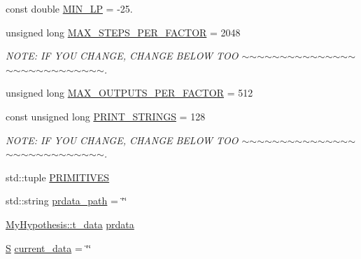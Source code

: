\begin{DoxyCompactItemize}
\item 
const double \hyperlink{_formal_language_theory-_complex_2_main_8cpp_afd489951f6acf58f00e714472db8b9f9}{M\+I\+N\+\_\+\+LP} = -\/25.
\item 
unsigned long \hyperlink{_formal_language_theory-_complex_2_main_8cpp_a33cfa353d2570ba1bc9b45b924e890ff}{M\+A\+X\+\_\+\+S\+T\+E\+P\+S\+\_\+\+P\+E\+R\+\_\+\+F\+A\+C\+T\+OR} = 2048
\begin{DoxyCompactList}\small\item\em N\+O\+TE\+: IF Y\+OU C\+H\+A\+N\+GE, C\+H\+A\+N\+GE B\+E\+L\+OW T\+OO $\sim$$\sim$$\sim$$\sim$$\sim$$\sim$$\sim$$\sim$$\sim$$\sim$$\sim$$\sim$$\sim$$\sim$$\sim$$\sim$$\sim$$\sim$$\sim$$\sim$$\sim$$\sim$$\sim$$\sim$$\sim$$\sim$$\sim$$\sim$. \end{DoxyCompactList}\item 
unsigned long \hyperlink{_formal_language_theory-_complex_2_main_8cpp_a78ab994cd90dbad4d470e8b4082ef882}{M\+A\+X\+\_\+\+O\+U\+T\+P\+U\+T\+S\+\_\+\+P\+E\+R\+\_\+\+F\+A\+C\+T\+OR} = 512
\item 
const unsigned long \hyperlink{_formal_language_theory-_complex_2_main_8cpp_a2806650ae26591d113cbc7f3d5184387}{P\+R\+I\+N\+T\+\_\+\+S\+T\+R\+I\+N\+GS} = 128
\begin{DoxyCompactList}\small\item\em N\+O\+TE\+: IF Y\+OU C\+H\+A\+N\+GE, C\+H\+A\+N\+GE B\+E\+L\+OW T\+OO $\sim$$\sim$$\sim$$\sim$$\sim$$\sim$$\sim$$\sim$$\sim$$\sim$$\sim$$\sim$$\sim$$\sim$$\sim$$\sim$$\sim$$\sim$$\sim$$\sim$$\sim$$\sim$$\sim$$\sim$$\sim$$\sim$$\sim$$\sim$. \end{DoxyCompactList}\item 
std\+::tuple \hyperlink{_formal_language_theory-_complex_2_main_8cpp_a04e6d8e4b74d3f4fc965e5e5449158a3}{P\+R\+I\+M\+I\+T\+I\+V\+ES}
\item 
std\+::string \hyperlink{_formal_language_theory-_complex_2_main_8cpp_aad659d32cecc0fd81857e5dbb67e0b1c}{prdata\+\_\+path} = \char`\"{}\char`\"{}
\item 
\hyperlink{class_bayesable_a70a593a67c7d43239ecc06bb4fd06a6b}{My\+Hypothesis\+::t\+\_\+data} \hyperlink{_formal_language_theory-_complex_2_main_8cpp_a5d75b43046f6e95350ab4ecc92d29b36}{prdata}
\item 
\hyperlink{_formal_language_theory-_complex_2_main_8cpp_a51c40915539205f0b5add30b0d68a4cb}{S} \hyperlink{_formal_language_theory-_complex_2_main_8cpp_a7738aad53d0b772202992e9bad69c250}{current\+\_\+data} = \char`\"{}\char`\"{}
\end{DoxyCompactItemize}


